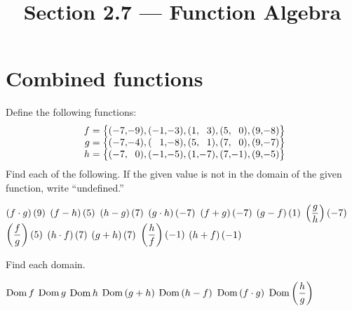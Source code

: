

\title{Section 2.7 --- Function Algebra}


\maketitle
\section*{Combined functions}
Define the following functions:
\[
\begin{array}{r@{\;=\big\{(}r@{,}r@{),(}r@{,}r@{),(}r@{,}r@{),(}r@{,}r@{),(}r@{,}r@{)\big\}}}
f&-7&-9&-1&-3&1&3&5&0&9&-8\\
g&-7&-4&1&-8&5&1&7&0&9&-7\\
h&-7&0&-1&-5&1&-7&7&-1&9&-5
\end{array}
\]
Find each of the following.  If the given value is not in the domain of the given function, write ``undefined.''
\begin{smenum}
\mitemxxxx
{$\left(f\cdot g\right)(9)$}
{$\left(f-h\right)(5)$}
{$\left(h-g\right)(7)$}
{$\left(g\cdot h\right)(-7)$}
\mitemxxxx
{$\left(f+g\right)(-7)$}
{$\left(g-f\right)(1)$}
{$\left(\dfrac{g}{h}\right)(-7)$}
{$\left(\dfrac{f}{g}\right)(5)$}
\mitemxxxx
{$\left(h\cdot f\right)(7)$}
{$\left(g+h\right)(7)$}
{$\left(\dfrac{h}{f}\right)(-1)$}
{$\left(h+f\right)(-1)$}
\end{smenum}
Find each domain.
\begin{smenum}
\mitemxxxo
{$\operatorname{Dom} f$}
{$\operatorname{Dom} g$}
{$\operatorname{Dom} h$}
\mitemxxxx
{$\operatorname{Dom}\left(g+h\right)$}
{$\operatorname{Dom}\left(h-f\right)$}
{$\operatorname{Dom}\left(f\cdot g\right)$}
{$\operatorname{Dom}\left(\dfrac{h}{g}\right)$}
\end{smenum}

